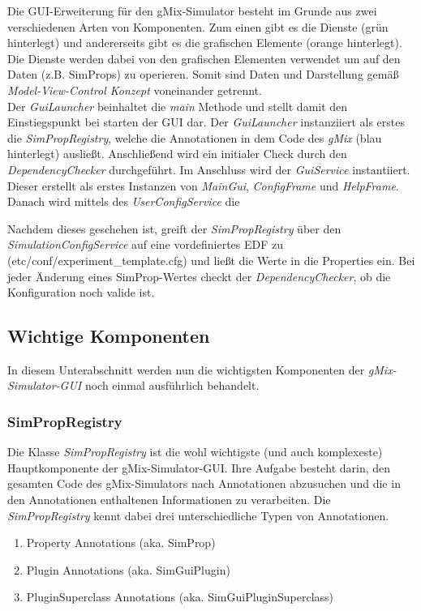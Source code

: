 \documentclass[a4paper, 11pt]{article} %
\begin{document}
Die GUI-Erweiterung für den gMix-Simulator besteht im Grunde aus zwei verschiedenen Arten von Komponenten. Zum einen gibt es die Dienste (grün hinterlegt) und andererseits gibt es die grafischen Elemente (orange hinterlegt). Die Dienste werden dabei von den grafischen Elementen verwendet um auf den Daten (z.B. SimProps) zu operieren. Somit sind Daten und Darstellung gemäß \emph{Model-View-Control Konzept} voneinander getrennt.\\

Der \emph{GuiLauncher} beinhaltet die \emph{main} Methode und stellt damit den Einstiegspunkt bei starten der GUI dar. Der \emph{GuiLauncher} instanziiert als erstes die \emph{SimPropRegistry}, welche die Annotationen in dem Code des \emph{gMix} (blau hinterlegt) ausließt. Anschließend wird ein initialer Check durch den \emph{DependencyChecker} durchgeführt. Im Anschluss wird der \emph{GuiService} instantiiert. Dieser erstellt als erstes Instanzen von \emph{MainGui}, \emph{ConfigFrame} und \emph{HelpFrame}. Danach wird mittels des \emph{UserConfigService} die 

Nachdem dieses geschehen ist, greift der \emph{SimPropRegistry} über den \emph{SimulationConfigService} auf eine vordefiniertes EDF zu (etc/conf/experiment\_template.cfg) und ließt die Werte in die Properties ein. Bei jeder Änderung eines SimProp-Wertes checkt der \emph{DependencyChecker}, ob die Konfiguration noch valide ist.

\subsection{Wichtige Komponenten} %
\label{ssub:einzelne_komponenten}
In diesem Unterabschnitt werden nun die wichtigsten Komponenten der \emph{gMix-Simulator-GUI} noch einmal ausführlich behandelt.

\subsubsection{SimPropRegistry}
\label{sssub:simpropregistry}
Die Klasse \emph{SimPropRegistry} ist die wohl wichtigste (und auch komplexeste) Hauptkomponente der gMix-Simulator-GUI. Ihre Aufgabe besteht darin, den gesamten Code des gMix-Simulators nach Annotationen abzusuchen und die in den Annotationen enthaltenen Informationen zu verarbeiten. Die \emph{SimPropRegistry} kennt dabei drei unterschiedliche Typen von Annotationen.

\begin{enumerate}
	\item Property Annotations (aka. SimProp)
	\item Plugin Annotations (aka. SimGuiPlugin)
	\item PluginSuperclass Annotations (aka. SimGuiPluginSuperclass)
\end{enumerate}
\end{document}
